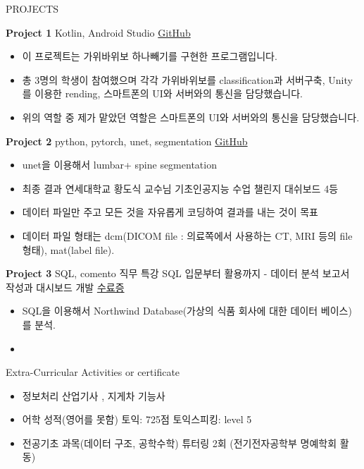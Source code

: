 \documentclass{resume} %
\begin{document}
\begin{rSection}{PROJECTS}
\vspace{-1.25em}
\item \textbf{Project 1} {Kotlin, Android Studio} \hfill \href{https://github.com/LeeGwanHui/Rock-Scissors-paper-kotlin}{GitHub}
\begin{itemize}
    \itemsep -3pt {} 
     \item 이 프로젝트는 가위바위보 하나빼기를 구현한 프로그램입니다. 
     \item 총 3명의 학생이 참여했으며 각각 가위바위보를 classification과 서버구축, Unity를 이용한 rending, 스마트폰의 UI와 서버와의 통신을 담당했습니다.
    \item 위의 역할 중 제가 맡았던 역할은 스마트폰의 UI와 서버와의 통신을 담당했습니다.
 \end{itemize}
\item \textbf{Project 2} {python, pytorch, unet, segmentation} \hfill \href{https://github.com/LeeGwanHui/lumbar}{GitHub}
\begin{itemize}
    \itemsep -3pt {} 
     \item unet을 이용해서 lumbar+ spine segmentation
     \item 최종 결과 연세대학교 황도식 교수님 기초인공지능 수업 챌린지 대쉬보드 4등
    \item 데이터 파일만 주고 모든 것을 자유롭게 코딩하여 결과를 내는 것이 목표 
    \item 데이터 파일 형태는 dcm(DICOM file : 의료쪽에서 사용하는 CT, MRI 등의 file 형태), mat(label file).
 \end{itemize}
\item \textbf{Project 3} {SQL, comento 직무 특강 SQL 입문부터 활용까지 - 데이터 분석 보고서 작성과 대시보드 개발 } \hfill \href{https://drive.google.com/file/d/1PEf-mlerQgi70gw5mVsfADWKnZp_6UBb/view?usp=sharing}{수료증}
\begin{itemize}
    \itemsep -3pt {} 
     \item SQL을 이용해서 Northwind Database(가상의 식품 회사에 대한 데이터 베이스)를 분석.
     \item 
 \end{itemize}
\end{rSection} 

\begin{rSection}{Extra-Curricular Activities or certificate} 
\begin{itemize}
    \item 	정보처리 산업기사 , 지게차 기능사
    \item	어학 성적(영어를 못함) 토익: 725점 토익스피킹: level 5
    \item   전공기초 과목(데이터 구조, 공학수학) 튜터링 2회 (전기전자공학부 명예학회 활동)
\end{itemize}


\end{rSection}
\end{document}
